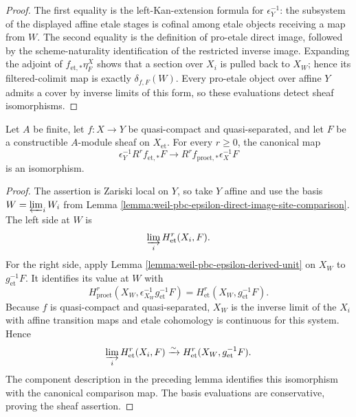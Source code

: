 \begin{proof}

The first equality is the left-Kan-extension formula for
$\epsilon_Y^{-1}$: the subsystem of the displayed affine etale stages is
cofinal among etale objects receiving a map from $W$.  The second equality is
the definition of pro-etale direct image, followed by the scheme-naturality
identification of the restricted inverse image.  Expanding the adjoint of
$f_{\mathrm{et},*}\eta^X_F$ shows that a section over $X_i$ is pulled back to
$X_W$; hence its filtered-colimit map is exactly $\delta_{f,F}(W)$.  Every
pro-etale object over affine $Y$ admits a cover by inverse limits of this
form, so these evaluations detect sheaf isomorphisms.
\end{proof}

\begin{lemma}
\label{lemma:weil-pbc-epsilon-direct-image-higher-sheaves}
\uses{}

Let $A$ be finite, let $f:X\to Y$ be quasi-compact and quasi-separated, and
let $F$ be a constructible $A$-module sheaf on $X_{\mathrm{et}}$.  For every
$r\geq0$, the canonical map
\[
 \epsilon_Y^{-1}R^rf_{\mathrm{et},*}F
 \longrightarrow R^rf_{\mathrm{proet},*}\epsilon_X^{-1}F
\]
is an isomorphism.
\end{lemma}
\begin{proof}

The assertion is Zariski local on $Y$, so take $Y$ affine and use the basis
$W=\varprojlim_iW_i$ from Lemma
\ref{lemma:weil-pbc-epsilon-direct-image-site-comparison}.  The left side at
$W$ is
\[
 \varinjlim_iH^r_{\mathrm{et}}(X_i,F).
\]
For the right side, apply Lemma \ref{lemma:weil-pbc-epsilon-derived-unit} on
$X_W$ to $g_{\mathrm{et}}^{-1}F$.  It identifies its value at $W$ with
\[
 H^r_{\mathrm{proet}}(X_W,\epsilon_{X_W}^{-1}g_{\mathrm{et}}^{-1}F)
 =H^r_{\mathrm{et}}(X_W,g_{\mathrm{et}}^{-1}F).
\]
Because $f$ is quasi-compact and quasi-separated, $X_W$ is the inverse limit
of the $X_i$ with affine transition maps and etale cohomology is continuous
for this system.  Hence
\[
 \varinjlim_iH^r_{\mathrm{et}}(X_i,F)
 \xrightarrow{\sim}H^r_{\mathrm{et}}(X_W,g_{\mathrm{et}}^{-1}F).
\]
The component description in the preceding lemma identifies this
isomorphism with the canonical comparison map.  The basis evaluations are
conservative, proving the sheaf assertion.
\end{proof}

